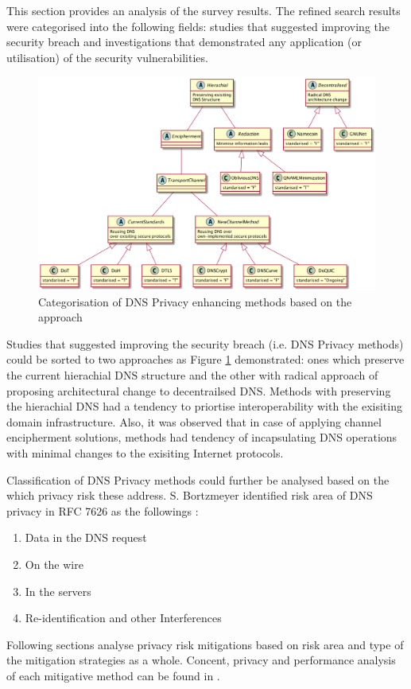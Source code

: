 This section provides an analysis of the survey results.
The refined search results were categorised into the following fields: studies that suggested improving the security breach and investigations that demonstrated any application (or utilisation) of the security vulnerabilities.

\begin{figure}[h!]
    \begin{center}
    \includegraphics*[width=1\columnwidth]{img/dnsprivacy-classification}
    \end{center}
    \caption{Categorisation of DNS Privacy enhancing methods based on the approach}
    \label{dns-methods-classification}
\end{figure}

Studies that suggested improving the security breach (i.e. DNS Privacy methods) could be sorted to two approaches as Figure \ref{dns-methods-classification} demonstrated: ones which preserve the current hierachial DNS structure and the other with radical approach of proposing architectural change to decentrailsed DNS.
Methods with preserving the hierachial DNS had a tendency to priortise interoperability with the exisiting domain infrastructure. Also, it was observed that in case of applying channel encipherment solutions, methods had tendency of incapsulating DNS operations with minimal changes to the exisiting Internet protocols.

Classification of DNS Privacy methods could further be analysed based on the which privacy risk these address. S. Bortzmeyer identified risk area of DNS privacy in RFC 7626 as the followings \cite{rfc7626}: 
\begin{enumerate}
    \item Data in the DNS request
    \item On the wire
    \item In the servers
    \item Re-identification and other Interferences
\end{enumerate}
Following sections analyse privacy risk mitigations based on risk area and type of the mitigation strategies as a whole. Concent, privacy and performance analysis of each mitigative method can be found in \cite{van2018privacy}.

